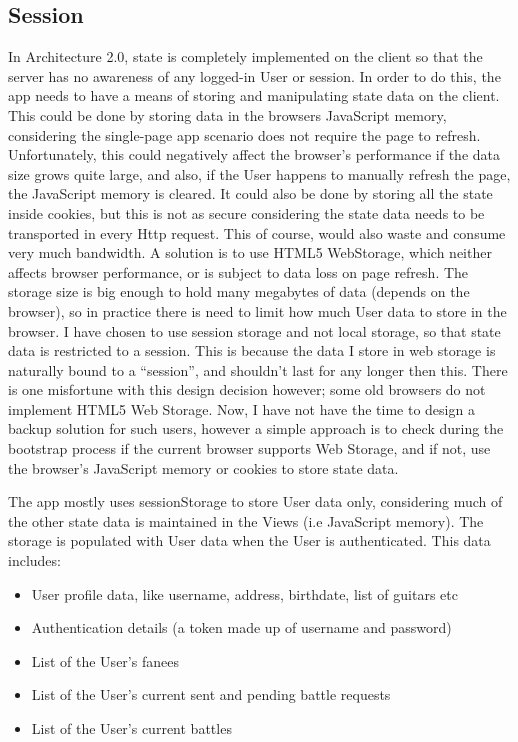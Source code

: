 \subsection{Session}
In Architecture 2.0, state is completely implemented on the client so that the server has no awareness of any logged-in User or session. In order to do this, the app needs to have a means of storing and manipulating state data on the client. This could be done by storing data in the browsers JavaScript memory, considering the single-page app scenario does not require the page to refresh. Unfortunately, this could negatively affect the browser's performance if the data size grows quite large, and also, if the User happens to manually refresh the page, the JavaScript memory is cleared. It could also be done by storing all the state inside cookies, but this is not as secure considering the state data needs to be transported in every Http request. This of course, would also waste and consume very much bandwidth. A solution is to use HTML5 WebStorage, which neither affects browser performance, or is subject to data loss on page refresh. The storage size is big enough to hold many megabytes of data (depends on the browser), so in practice there is need to limit how much User data to store in the browser. I have chosen to use session storage and not local storage, so that state data is restricted to a session. This is because the data I store in web storage is naturally bound to a ``session'', and shouldn't last for any longer then this. There is one misfortune with this design decision however; some old browsers do not implement HTML5 Web Storage. Now, I have not have the time to design a backup solution for such users, however a simple approach is to check during the bootstrap process if the current browser supports Web Storage, and if not, use the browser's JavaScript memory or cookies to store state data.

The app mostly uses sessionStorage to store User data only, considering much of the other state data is maintained in the Views (i.e JavaScript memory). The storage is populated with User data when the User is authenticated. This data includes:

\begin{itemize}
\item{} User profile data, like username, address, birthdate, list of guitars etc
\item{} Authentication details (a token made up of username and password)
\item{} List of the User's fanees
\item{} List of the User's current sent and pending battle requests 
\item{} List of the User's current battles
\end{itemize}

